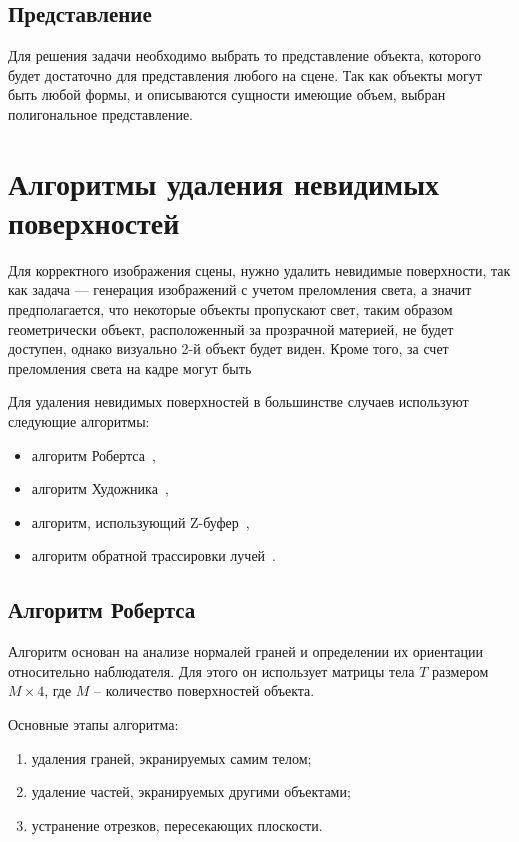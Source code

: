 \subsection{Представление}

Для решения задачи необходимо выбрать то представление объекта, которого будет достаточно для представления любого на сцене. Так как объекты могут быть любой формы, и описываются сущности имеющие объем, выбран полигональное представление.


\section{Алгоритмы удаления невидимых поверхностей}

Для корректного изображения сцены, нужно удалить невидимые поверхности, так как задача --- генерация изображений с учетом преломления света, а значит предполагается, что некоторые объекты пропускают свет, таким образом геометрически объект, расположенный за прозрачной материей, не будет доступен, однако визуально 2-й объект будет виден. Кроме того, за счет преломления света на кадре могут быть 


Для удаления невидимых поверхностей в большинстве случаев используют следующие алгоритмы:

\begin{itemize}
	\item алгоритм Робертса~\cite[с. 303]{rogers-book},
	\item алгоритм Художника~\cite[с. 387]{rogers-book},
	\item алгоритм, использующий Z-буфер~\cite[с. 375]{rogers-book},
	\item алгоритм обратной трассировки лучей~\cite[с. 432]{rogers-book}.
\end{itemize}

\subsection{Алгоритм Робертса}

Алгоритм основан на анализе нормалей граней и определении их ориентации относительно наблюдателя. Для этого он использует матрицы тела $T$ размером $M \times 4$, где $M$ -- количество поверхностей объекта.

Основные этапы алгоритма:
\begin{enumerate}
	\item удаления граней, экранируемых самим телом;
	\item удаление частей, экранируемых другими объектами;
	\item устранение отрезков, пересекающих плоскости.
\end{enumerate}

